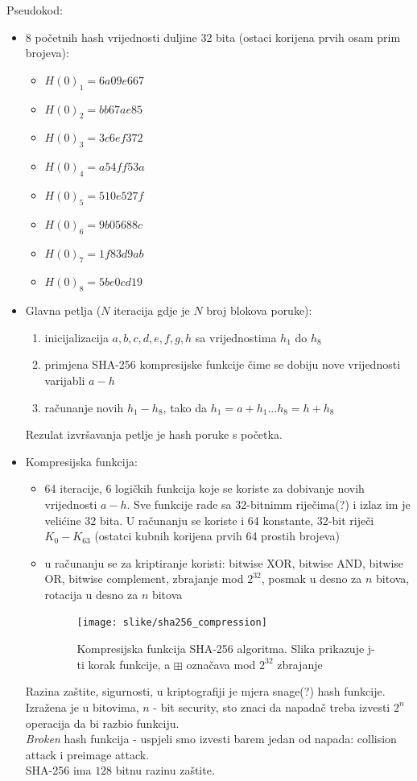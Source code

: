 \documentclass[12pt]{article}
\begin{document}
Pseudokod:
\begin{itemize}
	\item 8 početnih hash vrijednosti duljine 32 bita (ostaci korijena prvih osam prim brojeva):
	\begin{itemize}
		\item $H(0)_1 = 6a09e667$
		\item $H(0)_2 = bb67ae85$
		\item $H(0)_3 = 3c6ef372$
		\item $H(0)_4 = a54ff53a$
		\item $H(0)_5 = 510e527f$
		\item $H(0)_6 = 9b05688c$
		\item $H(0)_7 = 1f83d9ab$
		\item $H(0)_8 = 5be0cd19$
	\end{itemize}
	\item Glavna petlja ($N$ iteracija gdje je $N$ broj blokova poruke):
	\begin{enumerate}
		\item inicijalizacija $a, b, c, d, e, f, g, h$ sa vrijednostima $h_1$ do $h_8$
		\item primjena SHA-256 kompresijske funkcije čime se dobiju nove vrijednosti varijabli $a - h$
		\item računanje novih $h_1 - h_8$, tako da $h_1 = a + h_1 . . . h_8 = h + h_8$
	\end{enumerate}
	Rezulat izvršavanja petlje je hash poruke s početka.
	\item Kompresijska funkcija:
	\begin{itemize}
		\item 64 iteracije, 6 logičkih funkcija koje se koriste za dobivanje novih vrijednosti $a - h$. Sve funkcije rade sa 32-bitnimm riječima(?) i izlaz im je velićine 32 bita. U računanju se koriste i 64 konstante, 32-bit riječi $K_0-K_{63}$ (ostatci kubnih korijena prvih 64 prostih brojeva)
		\item u računanju se za kriptiranje koristi: bitwise XOR, bitwise AND, bitwise OR, bitwise complement, zbrajanje mod $2^{32}$, posmak u desno za $n$ bitova, rotacija u desno za $n$ bitova\cite{sha-description}
		\begin{figure}[h!]
			\centering
			\texttt{[image: slike/sha256\_compression]}
			\caption{Kompresijska funkcija SHA-256 algoritma. Slika prikazuje j-ti korak funkcije, a $\boxplus$ označava mod $2^{32}$ zbrajanje}
		\end{figure}
	\end{itemize}
	
	Razina zaštite, sigurnosti, u kriptografiji je mjera snage(?) hash funkcije. Izražena je u bitovima, $n$ - bit security, sto znaci da napadač treba izvesti $2^n$ operacija da bi razbio funkciju.\\ \textit{Broken} hash funkcija - uspjeli smo izvesti barem jedan od napada: collision attack i preimage attack. \\ 
	SHA-256 ima $128$ bitnu razinu zaštite.
\end{itemize}
\end{document}
